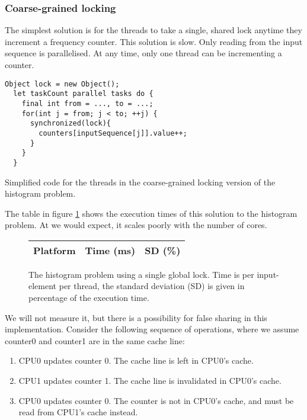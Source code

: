 \subsubsection{Coarse-grained locking}
The simplest solution is for the threads to take a single, shared lock anytime
they increment a frequency counter. This solution is slow. Only reading
from the input sequence is parallelised. At any time,
only one thread can be incrementing a counter.

\begin{code}
\begin{Verbatim}[frame=single]
  Object lock = new Object();
  let taskCount parallel tasks do {
    final int from = ..., to = ...;
    for(int j = from; j < to; ++j) {
      synchronized(lock){
        counters[inputSequence[j]].value++;
      }
    }
  }
\end{Verbatim}
	\caption{Simplified code for the threads in the coarse-grained locking
	version of the histogram problem.}
\end{code}

The table in figure \ref{table:histo-global} shows the execution times of this
solution to the histogram problem. At we would expect, it scales poorly with the number of cores.

\begin{figure}[hbtp]
	\centering
	\begin{tabular}{l r r}
		\hline
		\hline
		Platform & Time (ms) & SD (\%) \\
		\hline
		
		\hline
		\hline
	\end{tabular}
	\caption{The histogram problem using a single global lock. Time is per
	input-element per thread, the standard deviation (SD) is given in
	percentage of the execution time.}
	\label{table:histo-global}
\end{figure}

We will not measure it, but there is a possibility for false sharing in this
implementation. Consider the following sequence of operations, where we assume
counter0 and counter1 are in the same cache line:

\begin{enumerate}
	\item CPU0 updates counter 0. The cache line is left in CPU0's cache.
	\item \label{list:invalidation} CPU1 updates counter 1. The cache line is invalidated in CPU0's
		cache.
	\item \label{list:unneededread} CPU0 updates counter 0. The counter is not in CPU0's cache, and
		must be read from CPU1's cache instead.
\end{enumerate}

